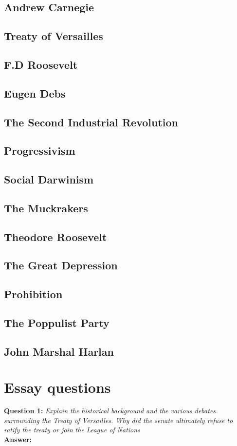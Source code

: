 \documentclass{article}
\begin{document}
\subsection{ Andrew Carnegie}
\subsection{ Treaty of Versailles}
\subsection{ F.D Roosevelt}
\subsection{ Eugen Debs }
\subsection{ The Second Industrial Revolution}
\subsection{ Progressivism}
\subsection{ Social Darwinism}
\subsection{ The Muckrakers}
\subsection{ Theodore Roosevelt}
\subsection{ The Great Depression}
\subsection{ Prohibition}
\subsection{ The Poppulist Party}
\subsection{ John Marshal Harlan}

\section{ Essay questions}
\textbf{Question 1:} \textit{Explain the historical background and the various debates surrounding the Treaty of Versailles. Why did the senate ultimately refuse to ratify the treaty or join the League of Nations}\\
\textbf{Answer:}       \\
\end{document}
